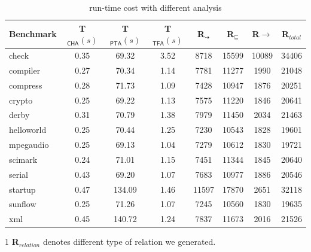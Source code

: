 \documentclass{fac}
\newcommand{\less}{\sqsubseteq}
\newcommand{\tflow}{\dashrightarrow}
\begin{document}

\begin{table} %
\centering
\begin{threeparttable}[b]
\begin{tabular}{lccccccc}
	\hline
	\textbf{Benchmark} & \hspace{-2pt}\textbf{T$_{\textsf{CHA}}(s)$}& \hspace{-2pt}\textbf{T$_{\textsf{PTA}}(s)$} & \hspace{-2pt}\textbf{T$_{\textsf{TFA}}(s)$} & \hspace{2pt}\textbf{R$_{\tflow}$}\hspace{2pt} & \hspace{2pt}\textbf{R$_{\less}$}\hspace{2pt} & \hspace{2pt}\textbf{R${\rightarrow}$}\hspace{2pt} &\textbf{R$_{total}$}\\
	\hline
check & 0.35 & 69.32 & 3.52 & 8718 & 15599 & 10089 & 34406\\
compiler & 0.27 & 70.34 & 1.14 & 7781 & 11277 & 1990 & 21048\\
compress & 0.28 & 71.73 & 1.09 & 7428 & 10947 & 1876 & 20251\\
crypto & 0.25 & 69.22 & 1.13 & 7575 & 11220 & 1846 & 20641\\
derby & 0.31 & 70.79 & 1.38 & 7979 & 11450 & 2034 & 21463\\
helloworld & 0.25 & 70.44 & 1.25 & 7230 & 10543 & 1828 & 19601\\
mpegaudio & 0.25 & 69.13 & 1.04 & 7279 & 10612 & 1830 & 19721\\
scimark & 0.24 & 71.01 & 1.15 & 7451 & 11344 & 1845 & 20640\\
serial & 0.43 & 69.20 & 1.07 & 7683 & 10977 & 1886 & 20546\\
startup & 0.47 & 134.09 & 1.46 & 11597 & 17870 & 2651 & 32118\\
sunflow & 0.25 & 71.26 & 1.07 & 7245 & 10560 & 1830 & 19635\\
xml & 0.45 & 140.72 & 1.24 & 7837 & 11673 & 2016 & 21526\\
	\hline
\end{tabular}
\begin{tablenotes}
  \item[1] \textbf{R}$_{relation}$ denotes different type of relation we generated.
\end{tablenotes}
\caption{run-time cost with different analysis}
\label{table:TimeCost}
\end{threeparttable}
\end{table}
\end{document}

